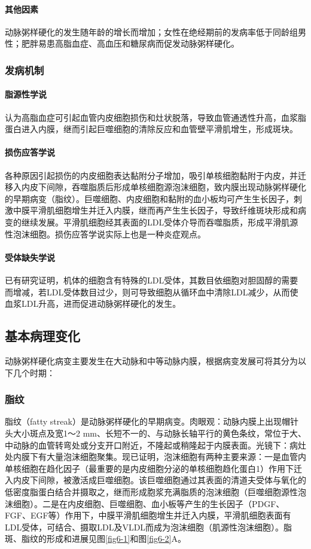 \paragraph{其他因素}
动脉粥样硬化的发生随年龄的增长而增加；女性在绝经期前的发病率低于同龄组男性；肥胖易患高脂血症、高血压和糖尿病而促发动脉粥样硬化。

\subsubsection{发病机制}

\paragraph{脂源性学说}
认为高脂血症可引起血管内皮细胞损伤和灶状脱落，导致血管通透性升高，血浆脂蛋白进入内膜，继而引起巨噬细胞的清除反应和血管壁平滑肌增生，形成斑块。

\paragraph{损伤应答学说}
各种原因引起损伤的内皮细胞表达黏附分子增加，吸引单核细胞黏附于内皮，并迁移入内皮下间隙，吞噬脂质后形成单核细胞源泡沫细胞，致内膜出现动脉粥样硬化的早期病变（脂纹）。巨噬细胞、内皮细胞和黏附的血小板均可产生生长因子，刺激中膜平滑肌细胞增生并迁入内膜，继而再产生生长因子，导致纤维斑块形成和病变的继续发展。平滑肌细胞经其表面的LDL受体介导而吞噬脂质，形成平滑肌源性泡沫细胞。损伤应答学说实际上也是一种炎症观点。

\paragraph{受体缺失学说}
已有研究证明，机体的细胞含有特殊的LDL受体，其数目依细胞对胆固醇的需要而增减，若LDL受体数目过少，则可导致细胞从循环血中清除LDL减少，从而使血浆LDL升高，进而促进动脉粥样硬化的发生。

\subsection{基本病理变化}

动脉粥样硬化病变主要发生在大动脉和中等动脉内膜，根据病变发展可将其分为以下几个时期：

\subsubsection{脂纹}

脂纹（fatty
streak）是动脉粥样硬化的早期病变。肉眼观：动脉内膜上出现帽针头大小斑点及宽1～2
mm、长短不一的、与动脉长轴平行的黄色条纹，常位于大、中动脉的血管转弯处或分支开口附近，不隆起或稍隆起于内膜表面。光镜下：病灶处内膜下有大量泡沫细胞聚集。现已证明，泡沫细胞有两种主要来源：一是血管内单核细胞在趋化因子（最重要的是内皮细胞分泌的单核细胞趋化蛋白1）作用下迁入内皮下间隙，被激活成巨噬细胞。该巨噬细胞通过其表面的清道夫受体与氧化的低密度脂蛋白结合并摄取之，继而形成胞浆充满脂质的泡沫细胞（巨噬细胞源性泡沫细胞）。二是在内皮细胞、巨噬细胞、血小板等产生的生长因子（PDGF、FGF、EGF等）作用下，中膜平滑肌细胞增生并迁入内膜，平滑肌细胞表面有LDL受体，可结合、摄取LDL及VLDL而成为泡沫细胞（肌源性泡沫细胞）。脂斑、脂纹的形成和进展见图\ref{fig6-1}和图\ref{fig6-2}A。

